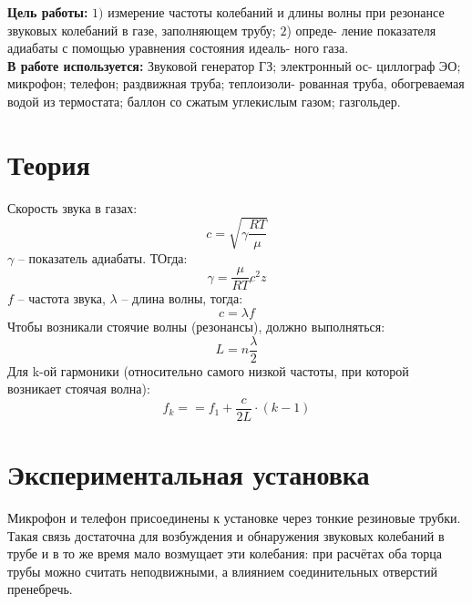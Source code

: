 \documentclass[11pt,a4paper]{article}
\author{\texttt{2.1.3}}\date{}
\begin{document}
  \textbf{Цель работы:} $1)$ измерение частоты колебаний и длины волны при
  резонансе звуковых колебаний в газе, заполняющем трубу; $2$) опреде-
  ление показателя адиабаты с помощью уравнения состояния идеаль-
  ного газа.\\
  \textbf{В работе используется:} Звуковой генератор ГЗ; электронный ос-
  циллограф ЭО; микрофон; телефон; раздвижная труба; теплоизоли-
  рованная труба, обогреваемая водой из термостата; баллон со сжатым
  углекислым газом; газгольдер.
  \section*{Теория}
  Скорость звука в газах: 
  \begin{equation*}
    c = \sqrt{\gamma\frac{RT}{\mu}}
  \end{equation*}
  $\gamma$ -- показатель адиабаты.
  ТОгда:
  \begin{equation*}
    \gamma = \frac{\mu}{RT}c^2z
  \end{equation*}
  $f$ -- частота звука, $\lambda$ -- длина волны, тогда:
  \begin{equation*}
    c = \lambda f
  \end{equation*}
  Чтобы возникали стоячие волны (резонансы), должно выполняться:
  \begin{equation*}
    L = n\frac{\lambda}{2}
  \end{equation*}
  Для k-ой гармоники (относительно самого низкой частоты, при которой возникает стоячая волна):
  \begin{equation*}
    f_k= = f_1 + \frac{c}{2L} \cdot (k - 1)
  \end{equation*}
  \section*{Экспериментальная установка}
  Микрофон и телефон присоединены к установке через тонкие резиновые трубки. 
  Такая связь достаточна для возбуждения и обнаружения звуковых колебаний 
  в трубе и в то же время мало возмущает эти колебания: при расчётах оба торца трубы можно считать неподвижными, а
влиянием соединительных отверстий пренебречь.
\end{document}
